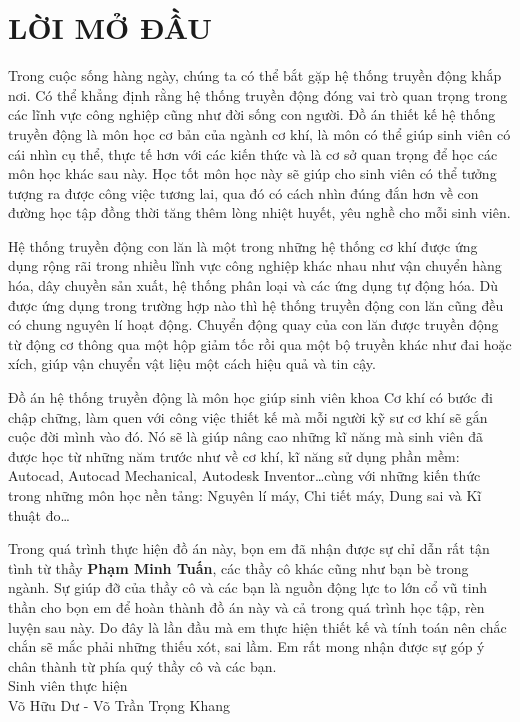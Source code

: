 \section*{LỜI MỞ ĐẦU}

    \hspace*{0.6cm}Trong cuộc sống hàng ngày, chúng ta có thể bắt gặp hệ thống truyền động khắp nơi. Có thể khẳng định rằng hệ thống truyền động đóng vai trò quan trọng trong các lĩnh vực công nghiệp cũng như đời sống con người. Đồ án thiết kế hệ thống truyền động là môn học cơ bản của ngành cơ khí, là môn có thể giúp sinh viên có cái nhìn cụ thể, thực tế hơn với các kiến thức và là cơ sở quan trọng để học các môn học khác sau này. Học tốt môn học này sẽ giúp cho sinh viên có thể tưởng tượng ra được công việc tương lai, qua đó có cách nhìn đúng đắn hơn về con đường học tập đồng thời tăng thêm lòng nhiệt huyết, yêu nghề cho mỗi sinh viên.

    Hệ thống truyền động con lăn là một trong những hệ thống cơ khí được ứng dụng rộng rãi trong nhiều lĩnh vực công nghiệp khác nhau như vận chuyển hàng hóa, dây chuyền sản xuất, hệ thống phân loại và các ứng dụng tự động hóa. Dù được ứng dụng trong trường hợp nào thì hệ thống truyền động con lăn cũng đều có chung nguyên lí hoạt động. Chuyển động quay của con lăn được truyền động từ động cơ thông qua một hộp giảm tốc rồi qua một bộ truyền khác như đai hoặc xích, giúp vận chuyển vật liệu một cách hiệu quả và tin cậy.

    Đồ án hệ thống truyền động là môn học giúp sinh viên khoa Cơ khí có bước đi chập chững, làm quen với công việc thiết kế mà mỗi người kỹ sư cơ khí sẽ gắn cuộc đời mình vào đó. Nó sẽ là giúp nâng cao những kĩ năng mà sinh viên đã được học từ những năm trước như về cơ khí, kĩ năng sử dụng phần mềm: Autocad, Autocad Mechanical, Autodesk Inventor\ldots cùng với những kiến thức trong những môn học nền tảng: Nguyên lí máy, Chi tiết máy, Dung sai và Kĩ thuật đo\ldots

    Trong quá trình thực hiện đồ án này, bọn em đã nhận được sự chỉ dẫn rất tận tình từ thầy \textbf{Phạm Minh Tuấn}, các thầy cô khác cũng như bạn bè trong ngành. Sự giúp đỡ của thầy cô và các bạn là nguồn động lực to lớn cổ vũ tinh thần cho bọn em để hoàn thành đồ án này và cả trong quá trình học tập, rèn luyện sau này. Do đây là lần đầu mà em thực hiện thiết kế và tính toán nên chắc chắn sẽ mắc phải những thiếu xót, sai lầm. Em rất mong nhận được sự góp ý chân thành từ phía quý thầy cô và các bạn. \\[1cm]
\hspace*{10cm}Sinh viên thực hiện \\[0.5cm]
\hspace*{8.5cm}Võ Hữu Dư - Võ Trần Trọng Khang\\